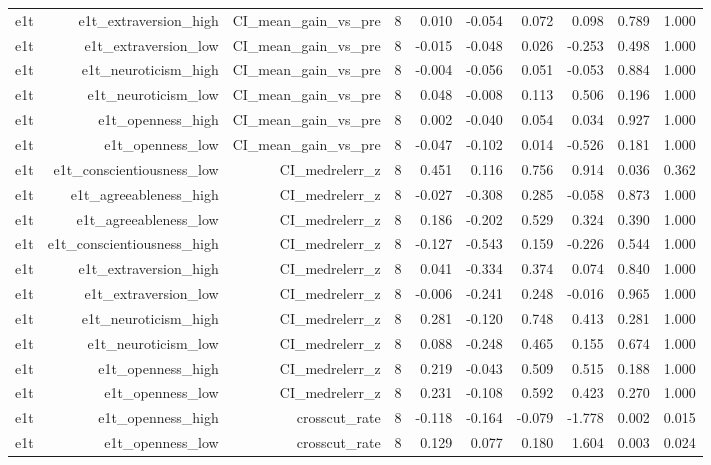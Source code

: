 \documentclass[11pt]{article}
\begin{document}
\begin{landscape}
\begin{longtable}{@{}lrrrrrrrrr@{}}
e1t & e1t\_extraversion\_high & CI\_mean\_gain\_vs\_pre & 8 & 0.010 & -0.054 & 0.072 & 0.098 & 0.789 & 1.000 \\
e1t & e1t\_extraversion\_low & CI\_mean\_gain\_vs\_pre & 8 & -0.015 & -0.048 & 0.026 & -0.253 & 0.498 & 1.000 \\
e1t & e1t\_neuroticism\_high & CI\_mean\_gain\_vs\_pre & 8 & -0.004 & -0.056 & 0.051 & -0.053 & 0.884 & 1.000 \\
e1t & e1t\_neuroticism\_low & CI\_mean\_gain\_vs\_pre & 8 & 0.048 & -0.008 & 0.113 & 0.506 & 0.196 & 1.000 \\
e1t & e1t\_openness\_high & CI\_mean\_gain\_vs\_pre & 8 & 0.002 & -0.040 & 0.054 & 0.034 & 0.927 & 1.000 \\
e1t & e1t\_openness\_low & CI\_mean\_gain\_vs\_pre & 8 & -0.047 & -0.102 & 0.014 & -0.526 & 0.181 & 1.000 \\
e1t & e1t\_conscientiousness\_low & CI\_medrelerr\_z & 8 & 0.451 & 0.116 & 0.756 & 0.914 & 0.036 & 0.362 \\
e1t & e1t\_agreeableness\_high & CI\_medrelerr\_z & 8 & -0.027 & -0.308 & 0.285 & -0.058 & 0.873 & 1.000 \\
e1t & e1t\_agreeableness\_low & CI\_medrelerr\_z & 8 & 0.186 & -0.202 & 0.529 & 0.324 & 0.390 & 1.000 \\
e1t & e1t\_conscientiousness\_high & CI\_medrelerr\_z & 8 & -0.127 & -0.543 & 0.159 & -0.226 & 0.544 & 1.000 \\
e1t & e1t\_extraversion\_high & CI\_medrelerr\_z & 8 & 0.041 & -0.334 & 0.374 & 0.074 & 0.840 & 1.000 \\
e1t & e1t\_extraversion\_low & CI\_medrelerr\_z & 8 & -0.006 & -0.241 & 0.248 & -0.016 & 0.965 & 1.000 \\
e1t & e1t\_neuroticism\_high & CI\_medrelerr\_z & 8 & 0.281 & -0.120 & 0.748 & 0.413 & 0.281 & 1.000 \\
e1t & e1t\_neuroticism\_low & CI\_medrelerr\_z & 8 & 0.088 & -0.248 & 0.465 & 0.155 & 0.674 & 1.000 \\
e1t & e1t\_openness\_high & CI\_medrelerr\_z & 8 & 0.219 & -0.043 & 0.509 & 0.515 & 0.188 & 1.000 \\
e1t & e1t\_openness\_low & CI\_medrelerr\_z & 8 & 0.231 & -0.108 & 0.592 & 0.423 & 0.270 & 1.000 \\
e1t & e1t\_openness\_high & crosscut\_rate & 8 & -0.118 & -0.164 & -0.079 & -1.778 & 0.002 & 0.015 \\
e1t & e1t\_openness\_low & crosscut\_rate & 8 & 0.129 & 0.077 & 0.180 & 1.604 & 0.003 & 0.024 \\

\end{longtable}
\end{landscape}
\end{document}

